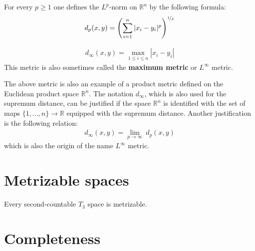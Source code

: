 	\begin{example}[p-metric]
		For every $p\geq1$ one defines the $L^p$-norm on $\mathbb{R}^n$ by the following formula:
		\begin{gather}
			\label{topology:p_metric}
			d_p(x,y) = \left(\sum_{i=1}^n|x_i-y_i|^p\right)^{\nicefrac{1}{p}}
		\end{gather}
	\end{example}
        \begin{example}
		\begin{gather}
        	    	\label{topology:chebyshev_distance}
        	    	d_\infty(x,y) = \max_{1\leq i\leq n}|x_i - y_i|
		\end{gather}
            	This metric is also sometimes called the \textbf{maximum metric} or $L^\infty$ metric.
	\end{example}
        \begin{remark}
        	The above metric is also an example of a product metric defined on the Euclidean product space $\mathbb{R}^n$. The notation $d_\infty$, which is also used for the supremum distance, can be justified if the space $\mathbb{R}^n$ is identified with the set of maps $\{1,...,n\}\rightarrow \mathbb{R}$ equipped with the supremum distance. Another justification is the following relation:
		\begin{gather}
			d_\infty(x,y) = \lim_{p\rightarrow\infty}\ d_p(x,y)
		\end{gather}
		which is also the origin of the name $L^\infty$ metric.
        \end{remark}

\section{Metrizable spaces}    
	
	\begin{theorem}
		Every second-countable $T_3$ space is metrizable.
	\end{theorem}

\section{Completeness}

